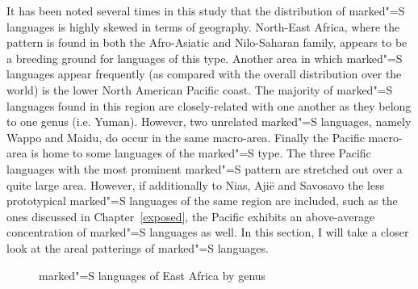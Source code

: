 It has been noted several times in this study that the distribution of marked"=S languages is highly skewed in terms of geography.
North-East Africa, where the pattern is found in both the Afro-Asiatic and Nilo-Saharan family, appears to be a breeding ground for languages of this type. 
Another area in which marked"=S languages appear frequently (as compared with the overall distribution over the world) is the lower North American Pacific coast. 
The majority of marked"=S languages found in this region are closely-related with one another as they belong to one genus (i.e. Yuman). 
However, two unrelated marked"=S languages, namely Wappo and Maidu, do occur in the same macro-area.
Finally the Pacific macro-area is home to some languages of the marked"=S type. 
The three Pacific languages with the most prominent marked"=S pattern are stretched out over a quite large area. 
However, if additionally to Nias, Aji\"e and Savosavo the less prototypical marked"=S languages of the same region are included, such as the ones discussed in Chapter~\ref{exposed}, the Pacific exhibits an above-average concentration of marked"=S languages as well. 
In this section, I will take a closer look at the areal patterings of marked"=S languages.

\begin{figure}[h,t,b] \centering {}
\caption{marked"=S languages of East Africa by genus}\label{MapAfrica}
\end{figure}

